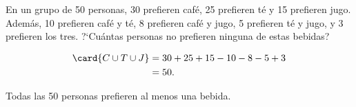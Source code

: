 \begin{problema}
	En un grupo de 50 personas, 30 prefieren café, 25 prefieren té y 15 prefieren jugo.  Además, 10 prefieren café y té, 8 prefieren café y jugo, 5 prefieren té y jugo, y 3 prefieren los tres.  ?`Cuántas personas no prefieren ninguna de estas bebidas?
	
	\begin{align*}
		\card{C \cup T \cup J} &= 30 + 25 + 15 - 10 - 8 - 5 + 3 \\
		&= 50.
	\end{align*}
	
	Todas las 50 personas prefieren al menos una bebida.
\end{problema}

